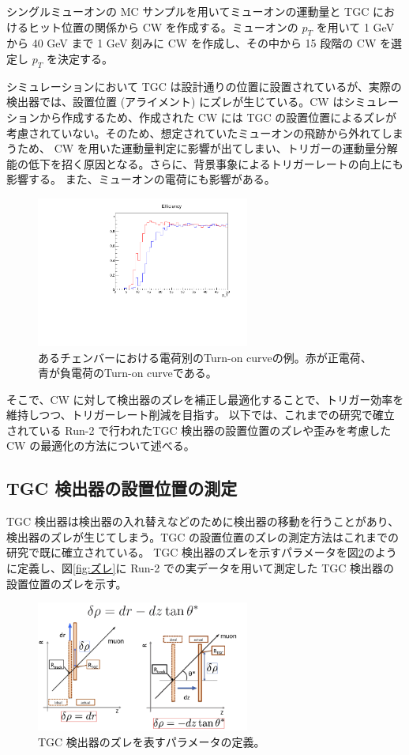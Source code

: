 シングルミューオンの MC サンプルを用いてミューオンの運動量と TGC におけるヒット位置の関係から CW を作成する。ミューオンの $p_T$ を用いて 1 GeV から 40 GeV まで 1 GeV 刻みに CW を作成し、その中から 15 段階の CW を選定し $p_T$ を決定する。




シミュレーションにおいて TGC は設計通りの位置に設置されているが、実際の検出器では、設置位置 (アライメント) にズレが生じている。CW はシミュレーションから作成するため、作成された CW には TGC の設置位置によるズレが考慮されていない。そのため、想定されていたミューオンの飛跡から外れてしまうため、 CW を用いた運動量判定に影響が出てしまい、トリガーの運動量分解能の低下を招く原因となる。さらに、背景事象によるトリガーレートの向上にも影響する。
また、ミューオンの電荷にも影響がある。

\begin{figure}[tb]
  \centering
  \includegraphics[clip, width=7cm]{fig/3/charge_14gev_phi2_eta11.pdf}
  \caption{あるチェンバーにおける電荷別のTurn-on curveの例。赤が正電荷、青が負電荷のTurn-on curveである。}
  \label{fig:fit_def}
\end{figure}

そこで、CW に対して検出器のズレを補正し最適化することで、トリガー効率を維持しつつ、トリガーレート削減を目指す。
以下では、これまでの研究で確立されている Run-2 で行われたTGC 検出器の設置位置のズレや歪みを考慮した CW の最適化の方法について述べる。

\subsection{TGC 検出器の設置位置の測定}
TGC 検出器は検出器の入れ替えなどのために検出器の移動を行うことがあり、検出器のズレが生じてしまう。TGC の設置位置のズレの測定方法はこれまでの研究で既に確立されている。
TGC 検出器のズレを示すパラメータを図\ref{fig:dr_para}のように定義し、図\ref{fig:ズレ}に Run-2 での実データを用いて測定した TGC 検出器の設置位置のズレを示す。
\begin{figure}[tb]
  \centering
  \includegraphics[clip, width=7cm]{fig/3/drho_param_position_measurement.png}
  \caption{TGC 検出器のズレを表すパラメータの定義。}
  \label{fig:dr_para}
\end{figure}


